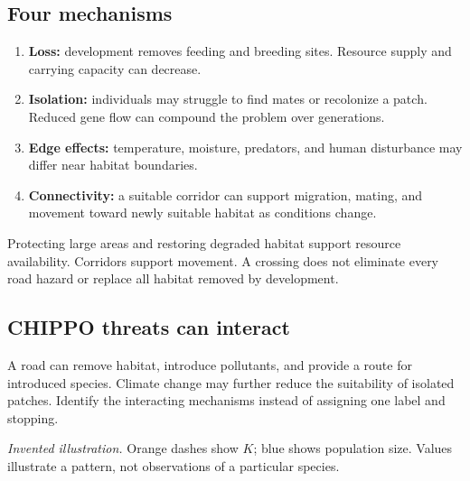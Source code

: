 \subsection*{Four mechanisms}
\begin{enumerate}
\item \textbf{Loss:} development removes feeding and breeding sites. Resource supply and carrying capacity can decrease.
\item \textbf{Isolation:} individuals may struggle to find mates or recolonize a patch. Reduced gene flow can compound the problem over generations.
\item \textbf{Edge effects:} temperature, moisture, predators, and human disturbance may differ near habitat boundaries.
\item \textbf{Connectivity:} a suitable corridor can support migration, mating, and movement toward newly suitable habitat as conditions change.
\end{enumerate}
Protecting large areas and restoring degraded habitat support resource availability. Corridors support movement. A crossing does not eliminate every road hazard or replace all habitat removed by development.
\subsection*{CHIPPO threats can interact}
A road can remove habitat, introduce pollutants, and provide a route for introduced species. Climate change may further reduce the suitability of isolated patches. Identify the interacting mechanisms instead of assigning one label and stopping.

\begin{center}
\par
\end{center}
\textit{Invented illustration.} Orange dashes show $K$; blue shows population size. Values illustrate a pattern, not observations of a particular species.
